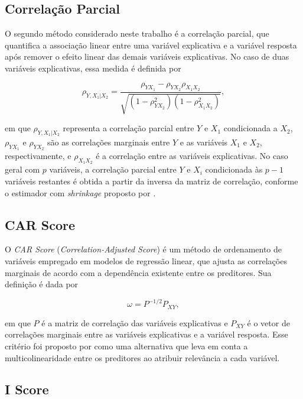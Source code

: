 \documentclass[12pt,fleqn]{article}
\newcommand{\citeonline}[1]{\citet{#1}}
\begin{document}
\subsection{Correlação Parcial}

O segundo método considerado neste trabalho é a correlação parcial, que quantifica a associação linear entre uma variável explicativa e a variável resposta após remover o efeito linear das demais variáveis explicativas. No caso de duas variáveis explicativas, essa medida é definida por

\begin{equation}
\rho_{Y, X_1 | X_2} =
\frac{\rho_{YX_1} - \rho_{YX_2}\rho_{X_{1}X_{2}}}
{\sqrt{(1-\rho_{YX_2}^2)(1-\rho_{X_{1}X_{2}}^2)}},
\end{equation}

\noindent em que $\rho_{Y,X_1|X_2}$ representa a correlação parcial entre $Y$ e $X_1$ condicionada a $X_2$, $\rho_{YX_1}$ e $\rho_{YX_2}$ são as correlações marginais entre $Y$ e as variáveis $X_1$ e $X_2$, respectivamente, e $\rho_{X_1X_2}$ é a correlação entre as variáveis explicativas. No caso geral com $p$ variáveis, a correlação parcial entre $Y$ e $X_i$ condicionada às $p-1$ variáveis restantes é obtida a partir da inversa da matriz de correlação, conforme o estimador com \emph{shrinkage} proposto por \citeonline{schafer2005}.

\subsection{CAR Score}

O \textit{CAR Score} (\textit{Correlation-Adjusted Score}) é um método de ordenamento de variáveis empregado em modelos de regressão linear, que ajusta as correlações marginais de acordo com a dependência existente entre os preditores. Sua definição é dada por

\begin{equation}
\omega = P^{-1/2}P_{XY},
\end{equation}

\noindent em que $P$ é a matriz de correlação das variáveis explicativas e $P_{XY}$ é o vetor de correlações marginais entre as variáveis explicativas e a variável resposta. Esse critério foi proposto por \citeonline{ZuberStrimmer2011} como uma alternativa que leva em conta a multicolinearidade entre os preditores ao atribuir relevância a cada variável.

\subsection{I Score}
\end{document}
